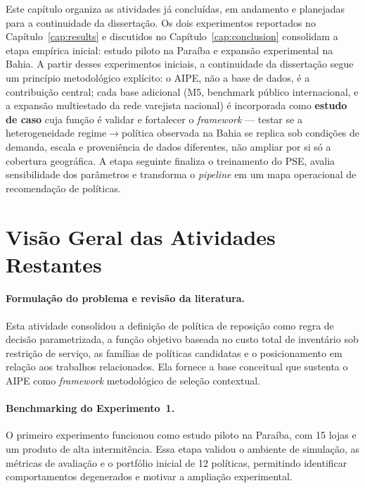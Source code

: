 
Este capítulo organiza as atividades já concluídas, em andamento e planejadas para a continuidade da dissertação. Os dois experimentos reportados no Capítulo~\ref{cap:results} e discutidos no Capítulo~\ref{cap:conclusion} consolidam a etapa empírica inicial: estudo piloto na Paraíba e expansão experimental na Bahia. A partir desses experimentos iniciais, a continuidade da dissertação segue um princípio metodológico explícito: o AIPE, não a base de dados, é a contribuição central; cada base adicional (M5, benchmark público internacional, e a expansão multiestado da rede varejista nacional) é incorporada como \textbf{estudo de caso} cuja função é validar e fortalecer o \textit{framework} — testar se a heterogeneidade regime$\rightarrow$política observada na Bahia se replica sob condições de demanda, escala e proveniência de dados diferentes, não ampliar por si só a cobertura geográfica. A etapa seguinte finaliza o treinamento do PSE, avalia sensibilidade dos parâmetros e transforma o \textit{pipeline} em um mapa operacional de recomendação de políticas.

\section{Visão Geral das Atividades Restantes}

\paragraph{Formulação do problema e revisão da literatura.}
Esta atividade consolidou a definição de política de reposição como regra de decisão parametrizada, a função objetivo baseada no custo total de inventário sob restrição de serviço, as famílias de políticas candidatas e o posicionamento em relação aos trabalhos relacionados. Ela fornece a base conceitual que sustenta o AIPE como \textit{framework} metodológico de seleção contextual.

\paragraph{Benchmarking do Experimento~1.}
O primeiro experimento funcionou como estudo piloto na Paraíba, com 15 lojas e um produto de alta intermitência. Essa etapa validou o ambiente de simulação, as métricas de avaliação e o portfólio inicial de 12 políticas, permitindo identificar comportamentos degenerados e motivar a ampliação experimental.

